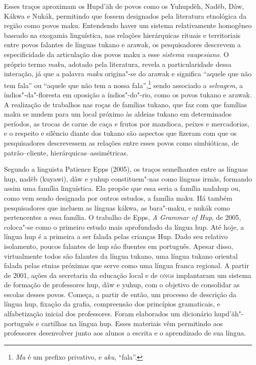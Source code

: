 Esses traços aproximam os Hupd'äh de povos como os Yuhupdëh, Nadëb, Dâw,
Kákwa e Nukák, permitindo que fossem designados pela literatura
etnológica da região como povos maku. Entendendo haver um sistema
relativamente homogêneo baseado na exogamia linguística, nas relações
hierárquicas rituais e territoriais entre povos falantes de línguas
tukano e arawak, os pesquisadores descrevem a especificidade da
articulação dos povos maku a esse \textit{sistema vaupesiano}. O próprio
termo \textit{maku}, adotado pela literatura, revela a particularidade dessa
interação, já que a palavra \textit{maku} origina"-se do arawak e significa
``aquele que não tem fala'' ou ``aquele que não tem a nossa fala'',\footnote{\textit{Ma} é um prefixo privativo, e \textit{aku}, ``fala''.} sendo associado a \textit{selvagem}, a
índios"-da"-floresta em oposição a índios"-do"-rio, como os povos tukano e
arawak. A realização de trabalhos nas roças de famílias tukano, que faz
com que famílias maku se mudem para um local próximo às aldeias tukano
em determinados períodos, as trocas de carne de caça e frutos por
mandioca, peixes e mercadorias, e o respeito e silêncio diante dos
tukano são aspectos que fizeram com que os pesquisadores descrevessem as
relações entre esses povos como simbióticas, de patrão--cliente,
hierárquicas--assimétricas.

Segundo a linguista Patience Epps (2005), os traços semelhantes entre as
línguas hup, nadëb (kuyawi), dâw e yuhup constituem"-nas como línguas
irmãs, formando assim uma família linguística. Ela propõe que essa seria
a família nadahup ou, como vem sendo designada por outros estudos, a
família maku. Há também pesquisadores que incluem as línguas kákwa, as bara"-maku, 
e nukák como pertencentes a essa família. O trabalho de
Epps, \textit{A Grammar of Hup}, de 2005, coloca"-se como o primeiro estudo
mais aprofundado da língua hup. Até hoje, a língua hup é a primeira a
ser falada pelas crianças Hup. Dado seu relativo isolamento, poucos
falantes de hup são fluentes em português. Apesar disso, virtualmente
todos são falantes da língua tukano, uma língua tukano oriental falada
pelas etnias próximas que serve como uma língua franca regional. A
partir de 2001, ações da secretaria da educação local e de \textsc{ong}s
implantaram um sistema de formação de professores hup, dâw e yuhup, com
o objetivo de consolidar as escolas desses povos. Começa, a partir de
então, um processo de descrição da língua hup, fixação da grafia,
compreensão dos princípios gramaticais, e alfabetização inicial dos
professores. Foram elaborados um dicionário hupd'äh"-português e
cartilhas na língua hup. Esses materiais vêm permitindo aos professores
desenvolver junto aos alunos a escrita e o aprendizado de sua língua.


